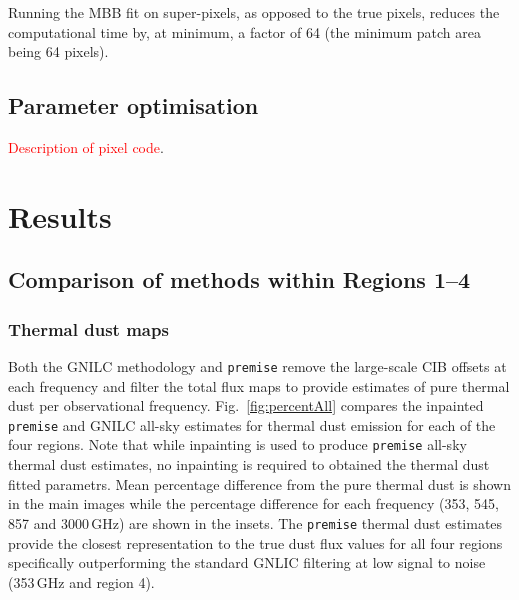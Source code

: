 \documentclass[a4paper,fleqn,usenatbib]{mnras}
\begin{document}
Running the MBB fit on super-pixels, as opposed to the true pixels, reduces the computational time by, at minimum, a factor of 64 (the minimum patch area being 64 pixels).  

\subsection{Parameter optimisation}

\textcolor{red}{Description of pixel code}.

\section{Results}
\label{sec:results}

\subsection{Comparison of methods within Regions 1--4}

\subsubsection{Thermal dust maps}

Both the GNILC methodology and {\texttt{premise}} remove the large-scale CIB offsets at each frequency and filter the total flux maps to provide estimates of pure thermal dust per observational frequency. Fig.~\ref{fig:percentAll} compares the inpainted \citep{inpaint} {\texttt{premise}} and GNILC all-sky estimates for thermal dust emission for each of the four regions. Note that while inpainting is used to produce {\texttt{premise}} all-sky thermal dust estimates, no inpainting is required to obtained the thermal dust fitted parametrs. Mean percentage difference from the pure thermal dust is shown in the main images while the percentage difference for each frequency (353, 545, 857 and 3000\,GHz) are shown in the insets. The {\texttt{premise}} thermal dust estimates provide the closest representation to the true dust flux values for all four regions specifically outperforming the standard GNLIC filtering at low signal to noise (353\,GHz and region 4).
\end{document}
